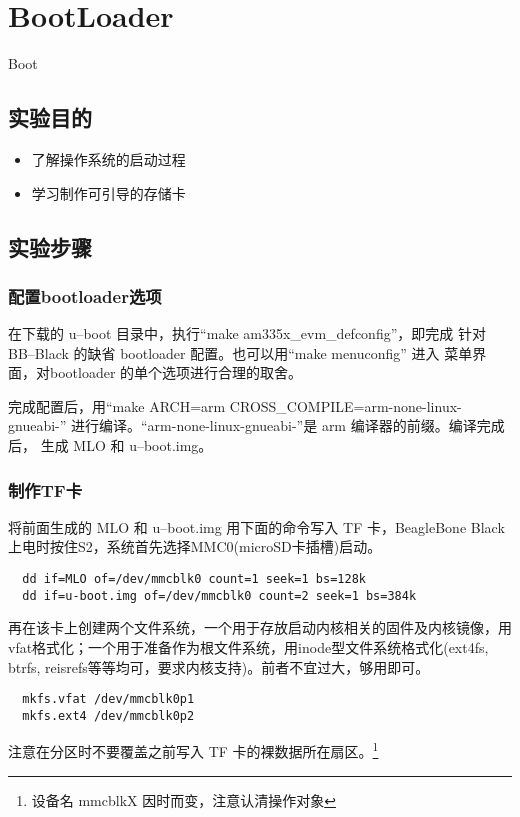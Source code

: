 \chapter{BootLoader}{Boot}

\section{实验目的}
\begin{itemize}
  \item 了解操作系统的启动过程
  \item 学习制作可引导的存储卡
\end{itemize}

\section{实验步骤}
\subsection{配置bootloader选项}
在下载的 u--boot 目录中，执行``make am335x\_evm\_defconfig''，即完成
针对 BB--Black 的缺省 bootloader 配置。也可以用``make menuconfig'' 进入
菜单界面，对bootloader 的单个选项进行合理的取舍。

	完成配置后，用``make ARCH=arm CROSS\_COMPILE=arm-none-linux-gnueabi-''
进行编译。``arm-none-linux-gnueabi-''是 arm 编译器的前缀。编译完成后，
生成 MLO 和 u--boot.img。

\subsection{制作TF卡}
	将前面生成的 MLO 和 u--boot.img 用下面的命令写入 TF 卡，BeagleBone Black
上电时按住S2，系统首先选择MMC0(microSD卡插槽)启动。

\begin{verbatim}
  dd if=MLO of=/dev/mmcblk0 count=1 seek=1 bs=128k
  dd if=u-boot.img of=/dev/mmcblk0 count=2 seek=1 bs=384k
\end{verbatim}

再在该卡上创建两个文件系统，一个用于存放启动内核相关的固件及内核镜像，用
vfat格式化；一个用于准备作为根文件系统，用inode型文件系统格式化(ext4fs, btrfs,
reisrefs等等均可，要求内核支持)。前者不宜过大，够用即可。

\begin{verbatim}
  mkfs.vfat /dev/mmcblk0p1
  mkfs.ext4 /dev/mmcblk0p2
\end{verbatim}

注意在分区时不要覆盖之前写入 TF 卡的裸数据所在扇区。\footnote{设备名 mmcblkX
因时而变，注意认清操作对象}

